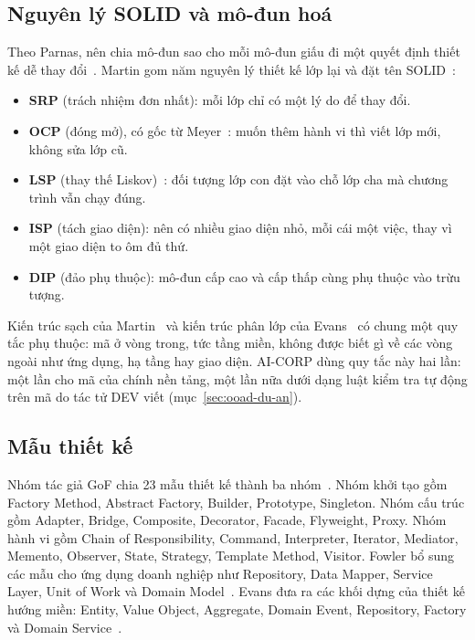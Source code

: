 \subsection{Nguyên lý SOLID và mô-đun hoá}

Theo Parnas, nên chia mô-đun sao cho mỗi mô-đun giấu đi một quyết định thiết kế dễ thay đổi~\cite{parnas1972}. Martin gom năm nguyên lý thiết kế lớp lại và đặt tên SOLID~\cite{martin2000,martin2017}:

\begin{itemize}
\item \textbf{SRP} (trách nhiệm đơn nhất): mỗi lớp chỉ có một lý do để thay đổi.
\item \textbf{OCP} (đóng mở), có gốc từ Meyer~\cite{meyer1997}: muốn thêm hành vi thì viết lớp mới, không sửa lớp cũ.
\item \textbf{LSP} (thay thế Liskov)~\cite{liskov1994}: đối tượng lớp con đặt vào chỗ lớp cha mà chương trình vẫn chạy đúng.
\item \textbf{ISP} (tách giao diện): nên có nhiều giao diện nhỏ, mỗi cái một việc, thay vì một giao diện to ôm đủ thứ.
\item \textbf{DIP} (đảo phụ thuộc): mô-đun cấp cao và cấp thấp cùng phụ thuộc vào trừu tượng.
\end{itemize}

Kiến trúc sạch của Martin~\cite{martin2017} và kiến trúc phân lớp của Evans~\cite{evans2003} có chung một quy tắc phụ thuộc: mã ở vòng trong, tức tầng miền, không được biết gì về các vòng ngoài như ứng dụng, hạ tầng hay giao diện. AI-CORP dùng quy tắc này hai lần: một lần cho mã của chính nền tảng, một lần nữa dưới dạng luật kiểm tra tự động trên mã do tác tử DEV viết (mục~\ref{sec:ooad-du-an}).

\subsection{Mẫu thiết kế}

Nhóm tác giả GoF chia 23 mẫu thiết kế thành ba nhóm~\cite{gamma1994}. Nhóm khởi tạo gồm Factory Method, Abstract Factory, Builder, Prototype, Singleton. Nhóm cấu trúc gồm Adapter, Bridge, Composite, Decorator, Facade, Flyweight, Proxy. Nhóm hành vi gồm Chain of Responsibility, Command, Interpreter, Iterator, Mediator, Memento, Observer, State, Strategy, Template Method, Visitor. Fowler bổ sung các mẫu cho ứng dụng doanh nghiệp như Repository, Data Mapper, Service Layer, Unit of Work và Domain Model~\cite{fowler2002}. Evans đưa ra các khối dựng của thiết kế hướng miền: Entity, Value Object, Aggregate, Domain Event, Repository, Factory và Domain Service~\cite{evans2003}.

